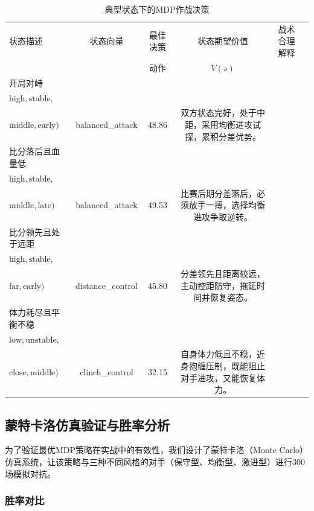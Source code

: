 \documentclass[a4paper,12pt]{article}
\numberwithin{equation}{section}
\numberwithin{table}{section}
\numberwithin{figure}{section}
\begin{document}
\begin{table}[H]
    \centering
    \caption{典型状态下的MDP作战决策}
    \label{tab:mdp_policy}
    \small
    \begin{tabular}{p{3.5cm}ccccp{4.5cm}}
        \toprule
        状态描述 & 状态向量 & 最佳决策 & 状态期望价值 & 战术合理解释 \\
         & & 动作 & $V(s)$ & \\
        \midrule
        开局对峙 & \shortstack{$(0,\text{high},\text{high},$\\$\text{high},\text{stable},$\\$\text{middle},\text{early})$} & balanced\_attack & 48.86 & 双方状态完好，处于中距，采用均衡进攻试探，累积分差优势。 \\
        比分落后且血量低 & \shortstack{$(-1,\text{low},\text{low},$\\$\text{high},\text{stable},$\\$\text{middle},\text{late})$} & balanced\_attack & 49.53 & 比赛后期分差落后，必须放手一搏，选择均衡进攻争取逆转。 \\
        比分领先且处于远距 & \shortstack{$(1,\text{low},\text{low},$\\$\text{high},\text{stable},$\\$\text{far},\text{early})$} & distance\_control & 45.80 & 分差领先且距离较远，主动控距防守，拖延时间并恢复姿态。 \\
        体力耗尽且平衡不稳 & \shortstack{$(0,\text{medium},\text{medium},$\\$\text{low},\text{unstable},$\\$\text{close},\text{middle})$} & clinch\_control & 32.15 & 自身体力低且不稳，近身抱缠压制，既能阻止对手进攻，又能恢复体力。 \\
        \bottomrule
    \end{tabular}
\end{table}

\subsection{蒙特卡洛仿真验证与胜率分析}

为了验证最优MDP策略在实战中的有效性，我们设计了蒙特卡洛（Monte Carlo）仿真系统，让该策略与三种不同风格的对手（保守型、均衡型、激进型）进行300场模拟对抗。

\subsubsection{胜率对比}
\end{document}
